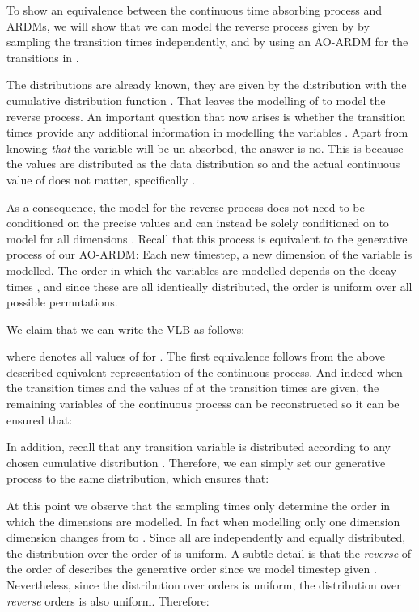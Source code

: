 \documentclass{article} \usepackage{iclr2022_conference,times}
\begin{document}
To show an equivalence between the continuous time absorbing process and ARDMs, we will show that we can model the reverse process given by  by sampling the transition times independently, and by using an AO-ARDM for the transitions in . 


The distributions  are already known, they are given by the distribution with the cumulative distribution function . That leaves the modelling of  to model the reverse process. An important question that now arises is whether the transition times  provide any additional information in modelling the variables . Apart from knowing \textit{that} the variable will be un-absorbed, the answer is no. This is because the values are distributed as the data distribution so  and the actual continuous value of  does not matter, specifically . 

As a consequence, the model for the reverse process does not need to be conditioned on the precise values  and can instead be solely conditioned on  to model  for all dimensions . Recall that this process is equivalent to the generative process of our AO-ARDM: Each new timestep, a new dimension of the variable is modelled. The order in which the variables are modelled depends on the decay times , and since these are all identically distributed, the order is uniform over all possible permutations.  


We claim that we can write the VLB as follows:

where  denotes all values of  for . The first equivalence follows from the above described equivalent representation of the continuous process. And indeed when the transition times and the values of  at the transition times are given, the remaining variables of the continuous process can be reconstructed so it can be ensured that:


In addition, recall that any transition variable is distributed according to any chosen cumulative distribution . Therefore, we can simply set our generative process to the same distribution, which ensures that:



At this point we observe that the sampling times only determine the order in which the dimensions  are modelled. In fact when modelling  only one dimension dimension changes from  to . Since all  are independently and equally distributed, the distribution over the order of  is uniform. A subtle detail is that the \textit{reverse} of the order of  describes the generative order since we model timestep  given . Nevertheless, since the distribution over orders is uniform, the distribution over \textit{reverse} orders is also uniform. Therefore:
\end{document}

